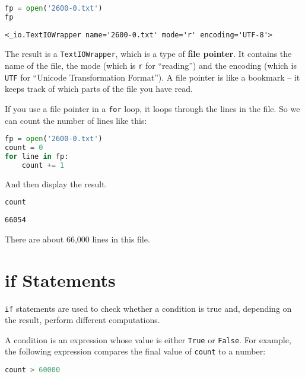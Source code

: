 \begin{lstlisting}[language=Python,style=source]
fp = open('2600-0.txt')
fp
\end{lstlisting}

\begin{lstlisting}[style=output]
<_io.TextIOWrapper name='2600-0.txt' mode='r' encoding='UTF-8'>
\end{lstlisting}

The result is a \passthrough{\lstinline!TextIOWrapper!}, which is a type
of \textbf{file pointer}. It contains the name of the file, the mode
(which is \passthrough{\lstinline!r!} for ``reading'') and the encoding
(which is \passthrough{\lstinline!UTF!} for ``Unicode Transformation
Format''). A file pointer is like a bookmark -- it keeps track of which
parts of the file you have read.

If you use a file pointer in a \passthrough{\lstinline!for!} loop, it
loops through the lines in the file. So we can count the number of lines
like this:

\begin{lstlisting}[language=Python,style=source]
fp = open('2600-0.txt')
count = 0
for line in fp:
    count += 1
\end{lstlisting}

And then display the result.

\begin{lstlisting}[language=Python,style=source]
count
\end{lstlisting}

\begin{lstlisting}[style=output]
66054
\end{lstlisting}

There are about 66,000 lines in this file.

\hypertarget{if-statements}{%
\section{if Statements}\label{if-statements}}

\passthrough{\lstinline!if!} statements are used to check whether a
condition is true and, depending on the result, perform different
computations.

A condition is an expression whose value is either
\passthrough{\lstinline!True!} or \passthrough{\lstinline!False!}. For
example, the following expression compares the final value of
\passthrough{\lstinline!count!} to a number:

\begin{lstlisting}[language=Python,style=source]
count > 60000
\end{lstlisting}

